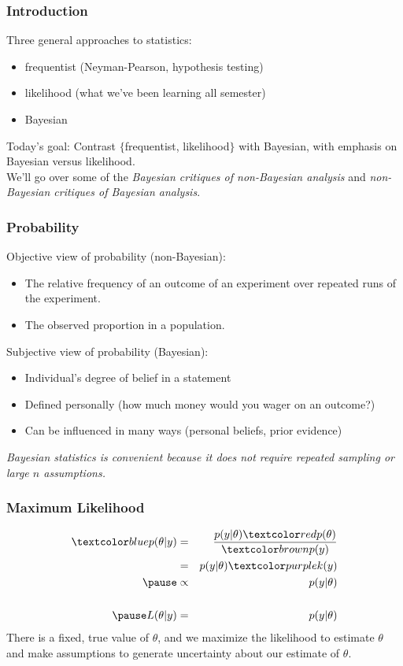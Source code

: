 \documentclass{beamer}
\begin{document}
\begin{frame}[fragile]
\frametitle{Introduction}
\pause
Three general approaches to statistics:
\pause
\begin{itemize}
\item frequentist (Neyman-Pearson, hypothesis testing)
\pause
\item likelihood (what we've been learning all semester)
\pause
\item Bayesian
\end{itemize}
\pause
\bigskip
Today's goal: Contrast $\{$frequentist, likelihood$\}$ with Bayesian,
\pause with emphasis on Bayesian versus likelihood.\\
\pause
\bigskip
We'll go over some of the \emph{Bayesian critiques of
non-Bayesian analysis} \pause and {\it non-Bayesian critiques of Bayesian analysis}.
\end{frame}

\begin{frame}
\frametitle{Probability}
\pause
Objective view of probability (non-Bayesian):
\pause
\begin{itemize}
\item The relative frequency of an outcome of an experiment over
repeated runs of the experiment.
\pause
\item The observed proportion in a population.
\end{itemize}
\pause
\bigskip
Subjective view of probability (Bayesian):
\pause
\begin{itemize}
\item Individual's degree of belief in a statement
\pause
\item Defined personally \pause (how much money would you wager on an
outcome?)
\pause
\item Can be influenced in many ways (personal beliefs, prior evidence)
\end{itemize}
\pause
\bigskip
\emph{Bayesian statistics is convenient because it does not require
repeated sampling or large $n$ assumptions.} 
\end{frame}

\begin{frame}
\frametitle{Maximum Likelihood}
\pause
\begin{eqnarray*}
\blue{p(\theta | y)} &=& \frac{p(y | \theta) \red{p(\theta)} }{\brown{p(y)}} \\
&=& p(y| \theta) \purple{k(y)} \\
\pause
&\propto& p(y | \theta) \\\\
\pause
L(\theta | y) &=& p(y | \theta)\\
\end{eqnarray*}
\pause
There is a fixed, true value of $\theta$, \pause and we maximize the
likelihood to estimate $\theta$ and make assumptions to generate
uncertainty about our estimate of $\theta$.
\end{frame}
\end{document}
